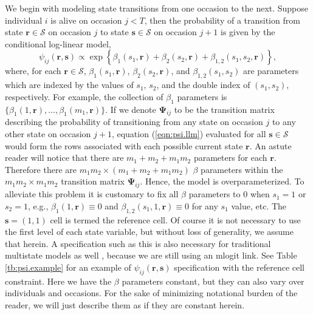 \documentclass[fleqn]{article}
\newcommand{\bs}{\ensuremath{\mathbf{s}}}
\newcommand{\fS}{\ensuremath{\mathcal{S}}}
\newcommand{\br}{\ensuremath{\mathbf{r}}}
\begin{document}
We begin with modeling state transitions from one occasion to the next. Suppose individual $i$ is alive on occasion $j<T$, then the probability of a transition from state $\br\in\fS$ on occasion $j$ to state $\bs\in\fS$ on occasion $j+1$ is given by the conditional log-linear model, 
\begin{equation}
\label{eqn:psi.llm}
\psi_{ij}(\br,\bs) \propto \exp\left\{\beta_1(s_1,\br) + \beta_2(s_2,\br) + \beta_{1,2}(s_1,s_2,\br)\right\},
\end{equation}
where, for each $\br\in\fS$, $\beta_1(s_1,\br)$, $\beta_2(s_2,\br)$, and $\beta_{1,2}(s_1,s_2)$ are parameters which are indexed by the values of $s_1$, $s_2$, and the double index of $(s_1,s_2)$, respectively. For example, the collection of $\beta_1$ parameters is $\{\beta_1(1,\br),\dots,\beta_1(m_1,\br)\}$. If we denote $\boldsymbol{\Psi}_{ij}$ to be the transition matrix describing the probability of transitioning from any state on occasion $j$ to any other state on occasion $j+1$, equation (\ref{eqn:psi.llm}) evaluated for all $\bs\in \fS$ would form the rows associated with each possible current state $\br$. An astute reader will notice that there are $m_1+m_2+m_1m_2$ parameters for each $\br$. Therefore there are $m_1m_2 \times (m_1+m_2+m_1m_2)$ $\beta$ parameters within the $m_1m_2\times m_1m_2$ transition matrix $\boldsymbol{\Psi}_{ij}$. Hence, the model is overparameterized. To alleviate this problem it is customary to fix all $\beta$ parameters to $0$ when $s_1=1$ or $s_2=1$, e.g., $\beta_1(1,\br)\equiv 0$ and $\beta_{1,2}(s_1,1,\br)\equiv 0$ for any $s_1$ value, etc. The $\bs=(1,1)$ cell is termed the reference cell. Of course it is not necessary to use the first level of each state variable, but without loss of generality, we assume that herein. A specification such as this is also necessary for traditional multistate models as well \citep{Laake:2013ab}, because we are still using an mlogit link. See Table \ref{tb:psi.example} for an example of $\psi_{ij}(\br,\bs)$ specification with the reference cell constraint. Here we have  the $\beta$ parameters constant, but they can also vary over individuals and occasions. For the sake of minimizing notational burden of the reader, we will just describe them as if they are constant herein. 
\end{document}
